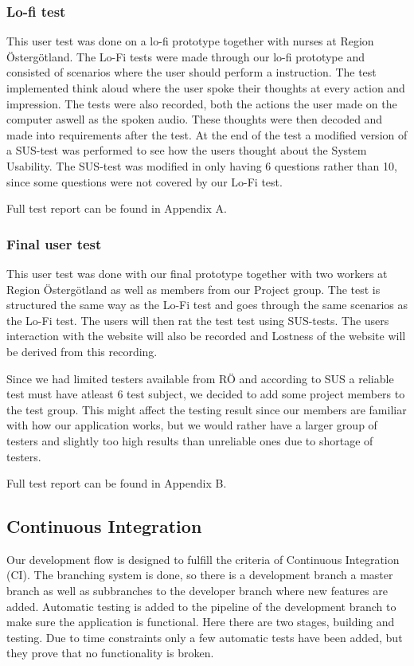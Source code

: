 \subsubsection{Lo-fi test}
This user test was done on a lo-fi prototype together with nurses at Region Östergötland. The Lo-Fi tests were made through our lo-fi prototype and consisted of scenarios where the user should perform a instruction. The test implemented think aloud where the user spoke their thoughts at every action and impression. The tests were also recorded, both the actions the user made on the computer aswell as the spoken audio. These thoughts were then decoded and made into requirements after the test. At the end of the test a modified version of a SUS-test was performed to see how the users thought about the System Usability. The SUS-test was modified in only having 6 questions rather than 10, since some questions were not covered by our Lo-Fi test.

Full test report can be found in Appendix A.
\subsubsection{Final user test}
This user test was done with our final prototype together with two workers at Region Östergötland as well as members from our Project group. The test is structured the same way as the Lo-Fi test and goes through the same scenarios as the Lo-Fi test. The users will then rat the test test using SUS-tests. The users interaction with the website will also be recorded and Lostness of the website will be derived from this recording. 

Since we had limited testers available from RÖ and according to SUS a reliable test must have atleast 6 test subject, we decided to add some project members to the test group. This might affect the testing result since our members are familiar with how our application works, but we would rather have a larger group of testers and slightly too high results than unreliable ones due to shortage of testers. 

Full test report can be found in Appendix B.
\subsection{Continuous Integration}
Our development flow is designed to fulfill the criteria of Continuous Integration (CI). The branching system is done, so there is a development branch a master branch as well as subbranches to the developer branch where new features are added. Automatic testing is added to the pipeline of the development branch to make sure the application is functional. Here there are two stages, building and testing. Due to time constraints only a few automatic tests have been added, but they prove that no functionality is broken. 

